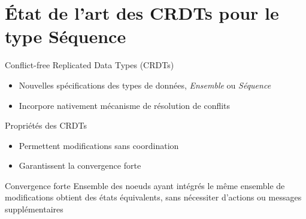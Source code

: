 \section{État de l'art des CRDTs pour le type Séquence}

\begin{frame}{Conflict-free Replicated Data Types (CRDTs)  \cite{shapiro_2011_crdt}}
    \begin{itemize}
        \item Nouvelles spécifications des types de données, \eg \emph{Ensemble} ou \emph{Séquence}
        \item Incorpore nativement mécanisme de résolution de conflits
    \end{itemize}
    \pause
    \begin{block}{Propriétés des CRDTs}
        \begin{itemize}
            \item Permettent modifications \alert{sans coordination}
            \item Garantissent la \alert{convergence forte}
        \end{itemize}
    \end{block}
    \pause
    \begin{block}{Convergence forte}
        Ensemble des noeuds ayant intégrés le même ensemble de modifications obtient des états équivalents, \alert{sans nécessiter d'actions ou messages supplémentaires}
    \end{block}
\end{frame}


